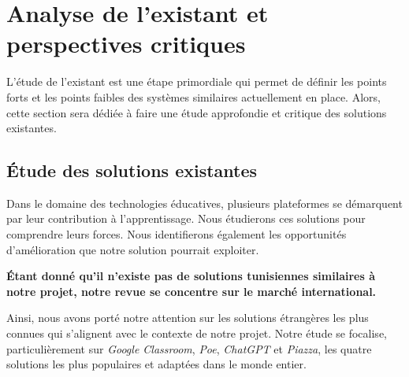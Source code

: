 
\section{Analyse de l’existant et perspectives critiques}
L’étude de l’existant est une étape primordiale qui permet de définir les points forts et les points faibles des systèmes similaires actuellement en place. Alors, cette section sera dédiée à faire une étude approfondie et critique des solutions existantes.

\subsection{Étude des solutions existantes}
Dans le domaine des technologies éducatives, plusieurs plateformes se démarquent par leur contribution à l'apprentissage. Nous étudierons ces solutions pour comprendre leurs forces. Nous identifierons également les opportunités d'amélioration que notre solution pourrait exploiter.

\vspace{0.5em}
\noindent \textbf{Étant donné qu’il n’existe pas de solutions tunisiennes similaires à notre projet, notre revue se concentre sur le marché international.}

\vspace{0.5em}
\noindent Ainsi, nous avons porté notre attention sur les solutions étrangères les plus connues qui s'alignent avec le contexte de notre projet. Notre étude se focalise, particulièrement sur \textit{Google Classroom}, \textit{Poe}, \textit{ChatGPT} et \textit{Piazza}, les quatre solutions les plus populaires et adaptées dans le monde entier.

